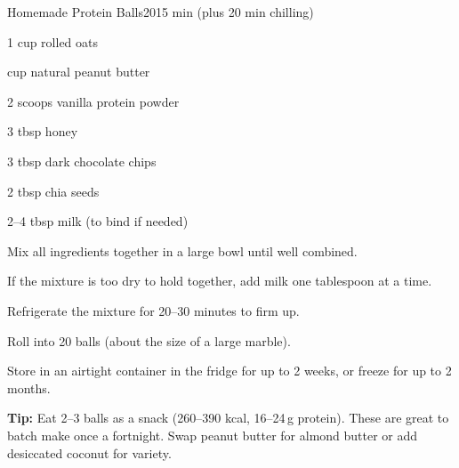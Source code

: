 \begin{recipebox}{Homemade Protein Balls}{20}{15 min (plus 20 min chilling)}
\begin{ingredients}
  \item 1 cup rolled oats
  \item \textonehalf{} cup natural peanut butter
  \item 2 scoops vanilla protein powder
  \item 3 tbsp honey
  \item 3 tbsp dark chocolate chips
  \item 2 tbsp chia seeds
  \item 2--4 tbsp milk (to bind if needed)
\end{ingredients}

\begin{method}
  \item Mix all ingredients together in a large bowl until well combined.
  \item If the mixture is too dry to hold together, add milk one tablespoon at a time.
  \item Refrigerate the mixture for 20--30 minutes to firm up.
  \item Roll into 20 balls (about the size of a large marble).
  \item Store in an airtight container in the fridge for up to 2 weeks, or freeze for up to 2 months.
\end{method}

\begin{notelist}
  \item \textbf{Tip:} Eat 2--3 balls as a snack (260--390 kcal, 16--24\,g protein). These are great to batch make once a fortnight. Swap peanut butter for almond butter or add desiccated coconut for variety.
\end{notelist}
\end{recipebox}

